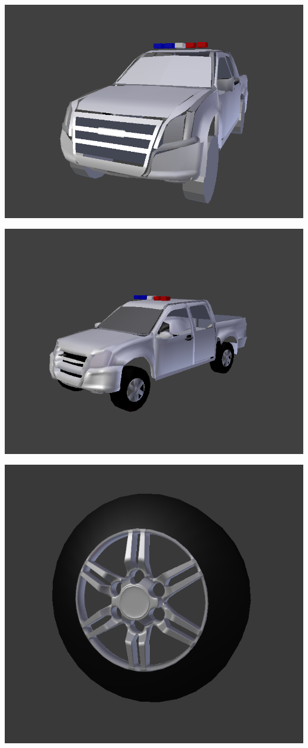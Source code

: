 \documentclass{article}
\begin{document}
  \includegraphics[width=\textwidth]{2.png}
  
  \includegraphics[width=\textwidth]{11.png}

  \includegraphics[width=\textwidth]{14.png}
\end{document}
